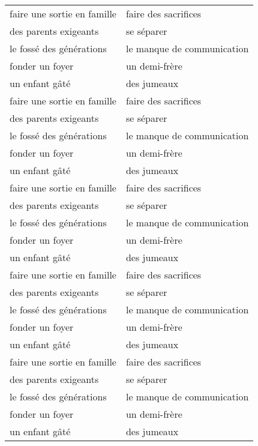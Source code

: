 \documentclass{article}
\date{}
\begin{document}
  \centering
  \noindent
  {\LARGE
    \begin{tabular}{| p{} | p{} |}
      \hline
      faire une sortie en famille &  faire des sacrifices \\
      des parents exigeants       &  se séparer \\
      le fossé des générations    &  le manque de communication \\
      fonder un foyer             &  un demi-frère \\
      un enfant gâté              &  des jumeaux \\
      \hline
      faire une sortie en famille &  faire des sacrifices \\
      des parents exigeants       &  se séparer \\
      le fossé des générations    &  le manque de communication \\
      fonder un foyer             &  un demi-frère \\
      un enfant gâté              &  des jumeaux \\
      \hline
      faire une sortie en famille &  faire des sacrifices \\
      des parents exigeants       &  se séparer \\
      le fossé des générations    &  le manque de communication \\
      fonder un foyer             &  un demi-frère \\
      un enfant gâté              &  des jumeaux \\
      \hline
      faire une sortie en famille &  faire des sacrifices \\
      des parents exigeants       &  se séparer \\
      le fossé des générations    &  le manque de communication \\
      fonder un foyer             &  un demi-frère \\
      un enfant gâté              &  des jumeaux \\
      \hline
      faire une sortie en famille &  faire des sacrifices \\
      des parents exigeants       &  se séparer \\
      le fossé des générations    &  le manque de communication \\
      fonder un foyer             &  un demi-frère \\
      un enfant gâté              &  des jumeaux \\
      \hline
    \end{tabular}
  }
\end{document}
